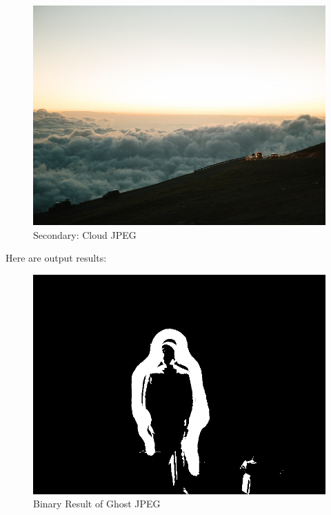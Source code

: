 \documentclass{article}
\begin{document}
\begin{figure}[h]
\includegraphics[width=\textwidth]{./labwork/data/cloud.jpeg}
\caption{Secondary: Cloud JPEG}
\end{figure}

Here are output results:

\begin{figure}[h]
\includegraphics[width=\textwidth]{./labwork6-gpu-out-binary.jpg}
\caption{Binary Result of Ghost JPEG}
\end{figure}
\end{document}
